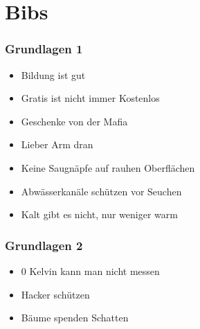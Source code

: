 \section{Bibs}

\begin{frame}
	\frametitle{Grundlagen 1}
	\begin{itemize}
		\item Bildung ist gut
		\item Gratis ist nicht immer Kostenlos
		\item Geschenke von der Mafia
		\item Lieber Arm dran
		\item Keine Saugnäpfe auf rauhen Oberflächen
		\item Abwässerkanäle schützen vor Seuchen
		\item Kalt gibt es nicht, nur weniger warm
	\end{itemize}
\end{frame}

\begin{frame}
	\frametitle{Grundlagen 2}
	\begin{itemize}
		\item 0 Kelvin kann man nicht messen
		\item Hacker schützen
		\item Bäume spenden Schatten
	\end{itemize}
\end{frame}

